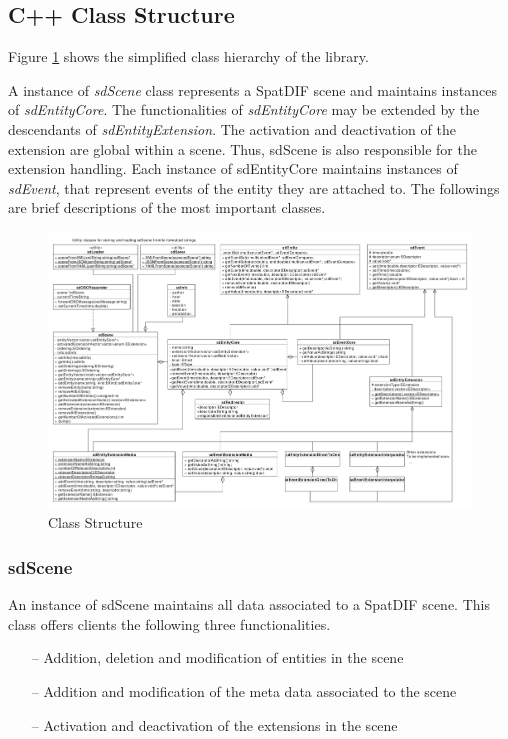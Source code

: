 \documentclass[a4paper]{article}
\begin{document}
\subsection{C++ Class Structure}

Figure \ref{fig:class_structure} shows the simplified class hierarchy of the library. 

A instance of {\it sdScene} class represents a SpatDIF scene and maintains instances of {\it sdEntityCore}. The functionalities of {\it sdEntityCore} may be extended by the descendants of {\it sdEntityExtension}. 
The activation and deactivation of the extension are global within a scene. 
Thus, sdScene is also responsible for the extension handling. 
Each instance of sdEntityCore maintains instances of {\it sdEvent}, that represent events of the entity they are attached to.
The followings are brief descriptions of the most important classes.

\begin{figure}[t]
\centerline{
	\includegraphics[width= 17.5cm]{classes.pdf}}
\caption{Class Structure}
\label{fig:class_structure}
\end{figure}

\subsubsection{sdScene}
An instance of sdScene maintains all data associated to a SpatDIF scene. This class offers clients the following three functionalities.

\begin{itemize}[leftmargin=*]
\item[--] Addition, deletion and modification of entities in the scene
\item[--] Addition and modification of the meta data associated to the scene
\item[--] Activation and deactivation of the extensions in the scene
\end{itemize}
\end{document}
